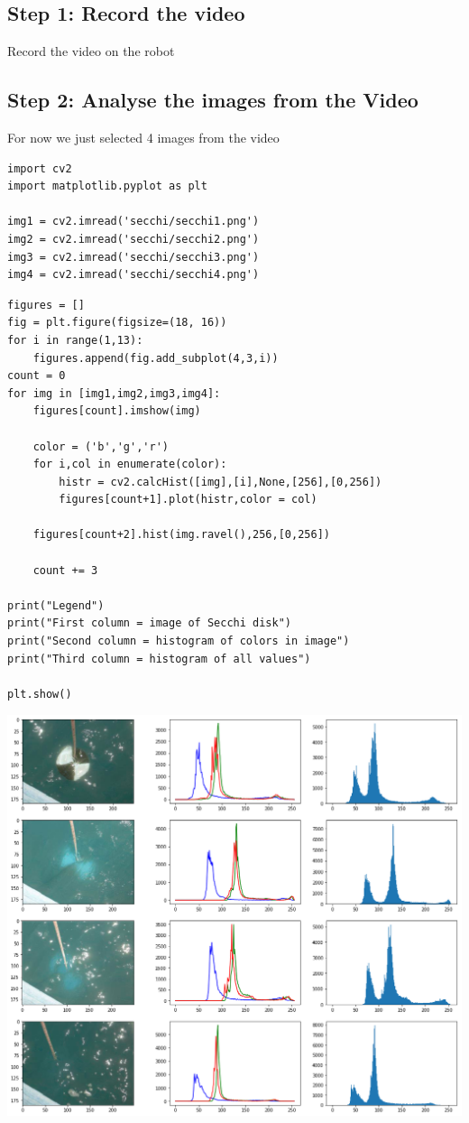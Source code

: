 \subsection{Step 1: Record the video}\label{step-1-record-the-video}

Record the video on the robot

\subsection{Step 2: Analyse the images from the
Video}\label{step-2-analyse-the-images-from-the-video}

For now we just selected 4 images from the video

\begin{verbatim}
import cv2
import matplotlib.pyplot as plt

img1 = cv2.imread('secchi/secchi1.png') 
img2 = cv2.imread('secchi/secchi2.png') 
img3 = cv2.imread('secchi/secchi3.png') 
img4 = cv2.imread('secchi/secchi4.png') 
\end{verbatim}

\begin{verbatim}
figures = []
fig = plt.figure(figsize=(18, 16))
for i in range(1,13):
    figures.append(fig.add_subplot(4,3,i))
count = 0
for img in [img1,img2,img3,img4]:
    figures[count].imshow(img)

    color = ('b','g','r')
    for i,col in enumerate(color):
        histr = cv2.calcHist([img],[i],None,[256],[0,256])
        figures[count+1].plot(histr,color = col)

    figures[count+2].hist(img.ravel(),256,[0,256])

    count += 3

print("Legend")
print("First column = image of Secchi disk")
print("Second column = histogram of colors in image")
print("Third column = histogram of all values")

plt.show() 
\end{verbatim}

\includegraphics[width=1.0\textwidth]{secchi-a/output_9_1.png}

